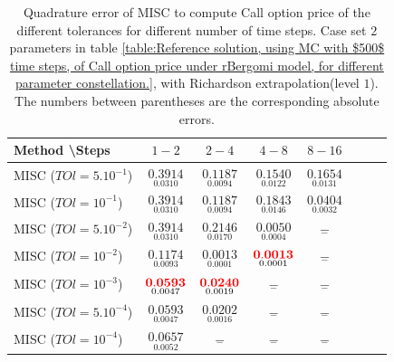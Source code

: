 \documentclass[11pt]{article}
\begin{document}
\begin{table}[h!]
	\centering
	\begin{tabular}{l*{6}{c}r}
		Method \textbackslash  Steps            & $1-2$ & $2-4$ & $4-8$ & $8-16$  \\
		\hline
			MISC ($TOl=5.10^{-1}$)  & $\underset{0.0310}{\mathbf{0.3914}}$ & $\underset{0.0094}{\mathbf{0.1187}}$ & $\underset{0.0122}{\mathbf{0.1540}}$ & $\underset{0.0131}{\mathbf{0.1654}}$ \\
		MISC ($TOl=10^{-1}$)  & $\underset{0.0310}{\mathbf{0.3914}}$ & $\underset{0.0094}{\mathbf{0.1187}}$ & $\underset{0.0146}{\mathbf{0.1843}}$ & $\underset{0.0032}{\mathbf{0.0404}}$  \\
				MISC ($TOl=5.10^{-2}$)  & $\underset{0.0310}{\mathbf{0.3914}}$ & $\underset{0.0170}{\mathbf{0.2146}}$ & $\underset{0.0004}{\mathbf{0.0050}}$ & $\underset{-}{\mathbf{-}}$  \\
		MISC ($TOl=10^{-2}$)  & $\underset{ 0.0093}{\mathbf{0.1174}}$ & $\underset{0.0001}{\mathbf{0.0013}}$ & $\underset{0.0001}{\mathbf{{\color{red}0.0013}}}$ & $\underset{-}{\mathbf{ -}}$  \\
		MISC ($TOl=10^{-3}$)  & $\underset{  0.0047}{\mathbf{ {\color{red}0.0593}
		}}$ & $\underset{ 0.0019}{\mathbf{ {\color{red}0.0240}}}$ & $\underset{-}{\mathbf{-}}$ & $\underset{-}{\mathbf{-}}$  \\
			MISC ($TOl=5.10^{-4}$)  & $\underset{  0.0047}{\mathbf{ 0.0593
	}}$ & $\underset{    0.0016}{\mathbf{ 0.0202}}$ & $\underset{-}{\mathbf{-}}$ & $\underset{-}{\mathbf{-}}$  \\
		MISC ($TOl=10^{-4}$)  & $\underset{  0.0052}{\mathbf{ 0.0657
	}}$ & $\underset{-}{\mathbf{-}}$ & $\underset{-}{\mathbf{-}}$ & $\underset{-}{\mathbf{-}}$  \\
		
		\hline
	\end{tabular}
	\caption{Quadrature error of MISC to compute Call option price of the different tolerances for different number of time steps. Case set $2$ parameters in table \ref{table:Reference solution, using MC with $500$ time steps, of Call option price under rBergomi model, for different parameter constellation.}, with Richardson extrapolation(level $1$). The numbers between parentheses are the corresponding absolute errors.}
	\label{Quadrature error of MISC to compute Call option price of the different tolerances for different number of time steps. Case set $2$ parameters, with Richardson extrapolation(level $1$). The numbers between parentheses are the corresponding absolute errors.}
\end{table}
\end{document}
